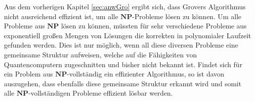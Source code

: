 Aus dem vorherigen Kapitel \ref{sec:anwGro} ergibt sich, dass Grovers Algorithmus nicht ausreichend effizient ist, um alle $\mathbf{NP}$-Probleme lösen zu können. 
Um alle Probleme aus $\mathbf{NP}$ lösen zu können, müssten für sehr verschiedene Probleme aus exponentiell großen Mengen von Lösungen die korrekten in polynomialer Laufzeit gefunden werden. 
Dies ist nur möglich, wenn all diese diversen Probleme eine gemeinsame Struktur aufweisen, welche auf die Fähigkeiten von Quantencomputern zugeschnitten und bisher nicht bekannt ist. 
Findet sich für ein Problem aus $\mathbf{NP}$-vollständig ein effizienter Algorithmus, so ist davon auszugehen, dass ebenfalls diese gemeinsame Struktur erkannt wird und somit alle $\mathbf{NP}$-vollständigen Probleme effizient lösbar werden.


